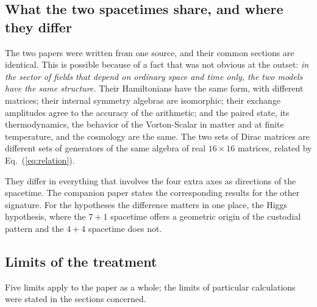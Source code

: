 \subsection{What the two spacetimes share, and where they differ}

The two papers were written from one source, and their common sections are identical. This is
possible because of a fact that was not obvious at the outset: \emph{in the sector of fields that
depend on ordinary space and time only, the two models have the same structure.} Their Hamiltonians
have the same form, with different matrices; their internal symmetry algebras are isomorphic; their
exchange amplitudes agree to the accuracy of the arithmetic; and the paired state, its
thermodynamics, the behavior of the Vorton-Scalar in matter and at finite temperature, and the
cosmology are the same. The two sets of Dirac matrices are different sets of generators of the same
algebra of real $16\times16$ matrices, related by Eq.~(\ref{eq:relation}).

They differ in everything that involves the four extra axes as directions of the spacetime.
 The companion paper
 states the corresponding results for the other
signature. For the hypotheses the difference matters in one place, the Higgs hypothesis, where the
$7+1$ spacetime offers a geometric origin of the custodial pattern and the $4+4$ spacetime does not.

\subsection{Limits of the treatment}

Five limits apply to the paper as a whole; the limits of particular calculations were stated in the
sections concerned.

